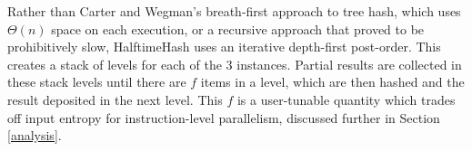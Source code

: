 \documentclass[runningheads]{llncs}
\begin{document}




Rather than Carter and Wegman's breath-first approach to tree hash, which uses $\Theta(n)$ space on each execution, or a recursive approach that proved to be prohibitively slow, HalftimeHash uses an iterative depth-first post-order.
This creates a stack of levels for each of the 3 instances.
Partial results are collected in these stack levels until there are $f$ items in a level, which are then hashed and the result deposited in the next level.
This $f$ is a user-tunable quantity which trades off input entropy for instruction-level parallelism, discussed further in Section \ref{analysis}.

\end{document}
